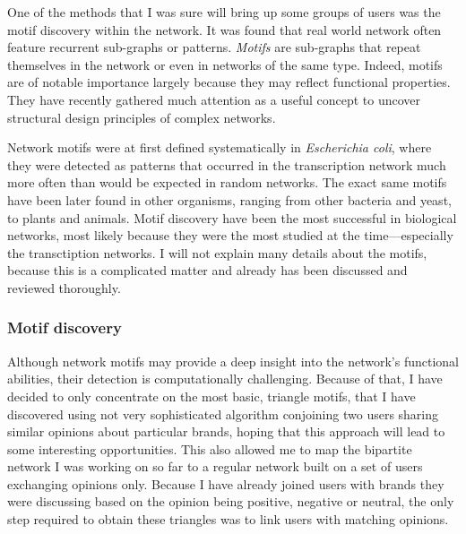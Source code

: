       One of the methods that I was sure will bring up some groups of users was the motif discovery within the network. It was found that real world network often feature recurrent sub-graphs or patterns. \emph{Motifs} are sub-graphs that repeat themselves in the network or even in networks of the same type. Indeed, motifs are of notable importance largely because they may reflect functional properties. They have recently gathered much attention as a useful concept to uncover structural design principles of complex networks.\cite{MasoudiSchreiberKashani2012}
      
      Network motifs were at first defined systematically in \emph{Escherichia coli}, where they were detected as patterns that occurred in the transcription network much more often than would be expected in random networks.\cite{MiloAlon2002} The exact same motifs have been later found in other organisms, ranging from other bacteria\cite{ManganZaslaverAlon2003,Eichenberger2004} and yeast\cite{MiloAlon2002, Lee2002}, to plants\cite{Saddic2006} and animals\cite{Boyer2005}. Motif discovery have been the most successful in biological networks, most likely because they were the most studied at the time---especially the transctiption networks. I will not explain many details about the motifs, because this is a complicated matter and already has been discussed and reviewed thoroughly.\cite{Alon2007}
      
    \subsubsection{Motif discovery}
      
      Although network motifs may provide a deep insight into the network's functional abilities, their detection is computationally challenging. Because of that, I have decided to only concentrate on the most basic, triangle motifs, that I have discovered using not very sophisticated algorithm conjoining two users sharing similar opinions about particular brands, hoping that this approach will lead to some interesting opportunities. This also allowed me to map the bipartite network I was working on so far to a regular network built on a set of users exchanging opinions only. Because I have already joined users with brands they were discussing based on the opinion being positive, negative or neutral, the only step required to obtain these triangles was to link users with matching opinions. 
      
